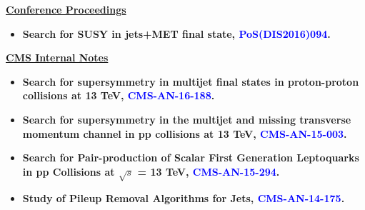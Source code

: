 \begin{titlepage}
\begin{itemize}
\end{itemize}
\vspace{0.5cm}
\underline{\bf \Large{Conference Proceedings}}

\begin{itemize}

\item {\bf Search for SUSY in jets+MET final state, \textcolor{blue}{ PoS(DIS2016)094}.}

\end{itemize}
\vspace{0.5cm}
\underline{\bf \Large{CMS Internal Notes}}

\begin{itemize}

\item {\bf Search for supersymmetry in multijet final states in proton-proton collisions at 13 TeV, \textcolor{blue}{CMS-AN-16-188}.}

\item{\bf Search for supersymmetry in the multijet and missing transverse momentum channel in pp collisions at 13 TeV, \textcolor{blue}{CMS-AN-15-003}. }

\item{\bf Search for Pair-production of Scalar First Generation
Leptoquarks in pp Collisions at $\sqrt{s}$ = 13 TeV, \textcolor{blue}{CMS-AN-15-294}. }

\item{\bf Study of Pileup Removal Algorithms for Jets, \textcolor{blue}{CMS-AN-14-175}.}

\end{itemize}





 

\vfill %

\end{titlepage}


